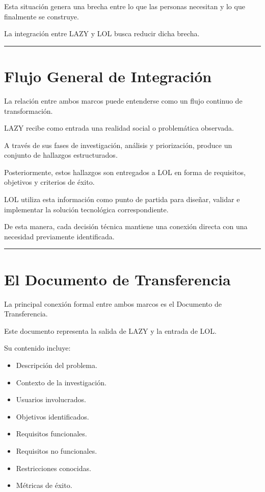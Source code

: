 \documentclass[14pt,a4paper,oneside]{extbook}
\begin{document}
Esta situación genera una brecha entre lo que las personas necesitan y lo que finalmente se construye.

La integración entre LAZY y LOL busca reducir dicha brecha.

\par\vspace{1.5em}\noindent\hfill\rule{0.25\textwidth}{0.6pt}\hfill\par\vspace{1.5em}

\section{Flujo General de Integración}

La relación entre ambos marcos puede entenderse como un flujo continuo de transformación.

LAZY recibe como entrada una realidad social o problemática observada.

A través de sus fases de investigación, análisis y priorización, produce un conjunto de hallazgos estructurados.

Posteriormente, estos hallazgos son entregados a LOL en forma de requisitos, objetivos y criterios de éxito.

LOL utiliza esta información como punto de partida para diseñar, validar e implementar la solución tecnológica correspondiente.

De esta manera, cada decisión técnica mantiene una conexión directa con una necesidad previamente identificada.

\par\vspace{1.5em}\noindent\hfill\rule{0.25\textwidth}{0.6pt}\hfill\par\vspace{1.5em}

\section{El Documento de Transferencia}

La principal conexión formal entre ambos marcos es el Documento de Transferencia.

Este documento representa la salida de LAZY y la entrada de LOL.

Su contenido incluye:

\begin{itemize}
\item Descripción del problema.
\item Contexto de la investigación.
\item Usuarios involucrados.
\item Objetivos identificados.
\item Requisitos funcionales.
\item Requisitos no funcionales.
\item Restricciones conocidas.
\item Métricas de éxito.
\end{itemize}
\end{document}

